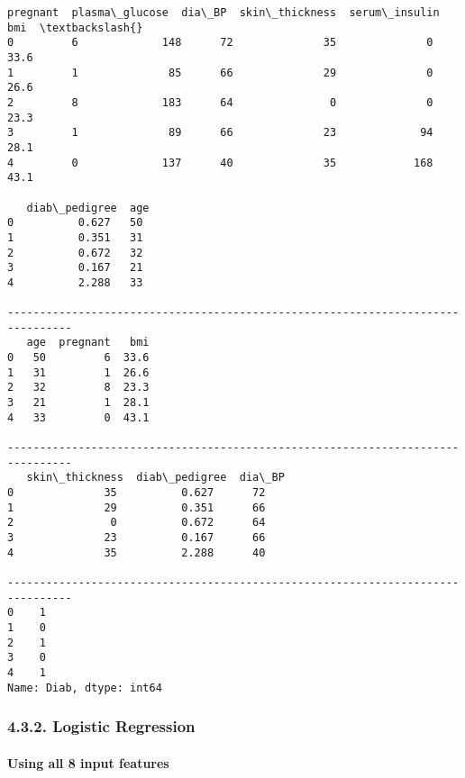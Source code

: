 \documentclass[11pt]{article}
\begin{document}
    \begin{Verbatim}[commandchars=\\\{\}]
   pregnant  plasma\_glucose  dia\_BP  skin\_thickness  serum\_insulin   bmi  \textbackslash{}
0         6             148      72              35              0  33.6
1         1              85      66              29              0  26.6
2         8             183      64               0              0  23.3
3         1              89      66              23             94  28.1
4         0             137      40              35            168  43.1

   diab\_pedigree  age
0          0.627   50
1          0.351   31
2          0.672   32
3          0.167   21
4          2.288   33

--------------------------------------------------------------------------------
   age  pregnant   bmi
0   50         6  33.6
1   31         1  26.6
2   32         8  23.3
3   21         1  28.1
4   33         0  43.1

--------------------------------------------------------------------------------
   skin\_thickness  diab\_pedigree  dia\_BP
0              35          0.627      72
1              29          0.351      66
2               0          0.672      64
3              23          0.167      66
4              35          2.288      40

--------------------------------------------------------------------------------
0    1
1    0
2    1
3    0
4    1
Name: Diab, dtype: int64
    \end{Verbatim}

    \hypertarget{logistic-regression}{%
\subsubsection{4.3.2. Logistic Regression}\label{logistic-regression}}

\hypertarget{using-all-8-input-features}{%
\paragraph{Using all 8 input
features}\label{using-all-8-input-features}}
\end{document}
